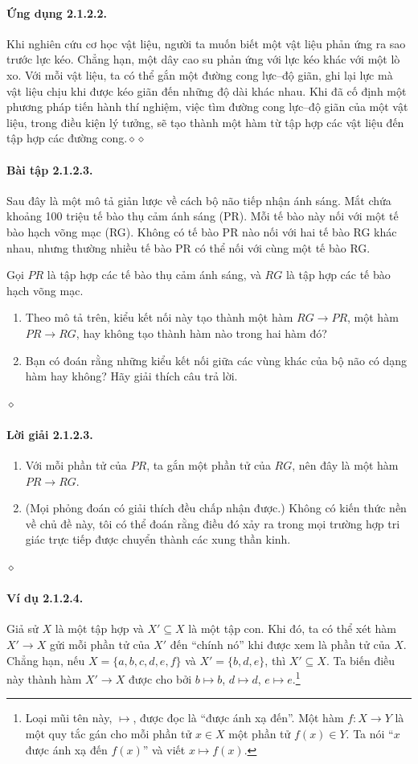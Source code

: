 \paragraph{Ứng dụng 2.1.2.2.} Khi nghiên cứu cơ học vật liệu, người ta muốn biết một vật liệu phản ứng ra sao trước lực kéo. Chẳng hạn, một dây cao su phản ứng với lực kéo khác với một lò xo. Với mỗi vật liệu, ta có thể gắn một đường cong lực--độ giãn, ghi lại lực mà vật liệu chịu khi được kéo giãn đến những độ dài khác nhau. Khi đã cố định một phương pháp tiến hành thí nghiệm, việc tìm đường cong lực--độ giãn của một vật liệu, trong điều kiện lý tưởng, sẽ tạo thành một hàm từ tập hợp các vật liệu đến tập hợp các đường cong.\hfill$\diamond\diamond$
\paragraph{Bài tập 2.1.2.3.} Sau đây là một mô tả giản lược về cách bộ não tiếp nhận ánh sáng. Mắt chứa khoảng 100 triệu tế bào thụ cảm ánh sáng (PR). Mỗi tế bào này nối với một tế bào hạch võng mạc (RG). Không có tế bào PR nào nối với hai tế bào RG khác nhau, nhưng thường nhiều tế bào PR có thể nối với cùng một tế bào RG.

Gọi $PR$ là tập hợp các tế bào thụ cảm ánh sáng, và $RG$ là tập hợp các tế bào hạch võng mạc.
\begin{enumerate}[label=\alph*.]
\item Theo mô tả trên, kiểu kết nối này tạo thành một hàm $RG\to PR$, một hàm $PR\to RG$, hay không tạo thành hàm nào trong hai hàm đó?
\item Bạn có đoán rằng những kiểu kết nối giữa các vùng khác của bộ não có dạng hàm hay không? Hãy giải thích câu trả lời.
\end{enumerate}\hfill$\diamond$
\paragraph{Lời giải 2.1.2.3.}
\begin{enumerate}[label=\alph*.]
\item Với mỗi phần tử của $PR$, ta gắn một phần tử của $RG$, nên đây là một hàm $PR\to RG$.
\item (Mọi phỏng đoán có giải thích đều chấp nhận được.) Không có kiến thức nền về chủ đề này, tôi có thể đoán rằng điều đó xảy ra trong mọi trường hợp tri giác trực tiếp được chuyển thành các xung thần kinh.
\end{enumerate}\hfill$\diamond$
\paragraph{Ví dụ 2.1.2.4.} Giả sử $X$ là một tập hợp và $X'\subseteq X$ là một tập con. Khi đó, ta có thể xét hàm $X'\to X$ gửi mỗi phần tử của $X'$ đến ``chính nó'' khi được xem là phần tử của $X$. Chẳng hạn, nếu $X=\{a,b,c,d,e,f\}$ và $X'=\{b,d,e\}$, thì $X'\subseteq X$. Ta biến điều này thành hàm $X'\to X$ được cho bởi $b\mapsto b$, $d\mapsto d$, $e\mapsto e$.\footnote{Loại mũi tên này, $\mapsto$, được đọc là ``được ánh xạ đến''. Một hàm $f:X\to Y$ là một quy tắc gán cho mỗi phần tử $x\in X$ một phần tử $f(x)\in Y$. Ta nói ``$x$ được ánh xạ đến $f(x)$'' và viết $x\mapsto f(x)$.}

